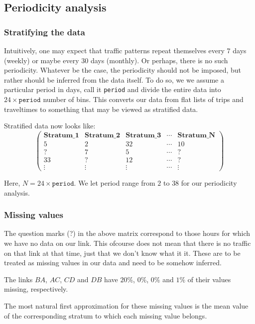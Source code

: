 \documentclass[10pt,a4paper]{amsart}
\begin{document}
\subsection{Periodicity analysis}
\subsubsection{Stratifying the data}
Intuitively, one may expect that traffic patterns repeat themselves
every \(7\) days (weekly) or maybe every \(30\) days (monthly). Or
perhaps, there is no such periodicity. Whatever be the case, the
periodicity should not be imposed, but rather should be inferred
from the data itself. To do so, we we assume a particular period in
days, call it \texttt{period} and divide the entire data into
\(24\times\mathtt{period}\) number of bins. This converts our data
from flat lists of trips and traveltimes to something that may be
viewed as stratified data. 

Stratified data now looks like:
	\[ \left( \begin{array}{ccccc}
	\mathbf{Stratum\_1} & \mathbf{Stratum\_2} & \mathbf{Stratum\_3} & \cdots &
		\mathbf{Stratum\_N} \\
	5 & 2 & 32 & \cdots & 10 \\
	? & 7 & 5 & \cdots & ? \\
	33 & ? & 12 & \cdots & ? \\
	\vdots & \vdots & \vdots & \cdots & \vdots
	\end{array} \right)\]

Here, \(N=24\times\mathtt{period}\). We let period range from \(2\)
to \(38\) for our periodicity analysis.

\subsubsection{Missing values}
The question marks (?) in the above matrix correspond to those hours for which
we have no data on our link. This ofcourse does not mean that there is no
traffic on that link at that time, just that we don't know what it it. These
are to be treated as missing values in our data and need to be somehow
inferred.

The links \(BA\), \(AC\), \(CD\) and \(DB\) have \(20\%\), \(0\%\), \(0\%\)
and \(1\%\) of their values missing, respectively.

The most natural first approximation for these missing values is the mean
value of the corresponding stratum to which each missing value belongs.
\end{document}
